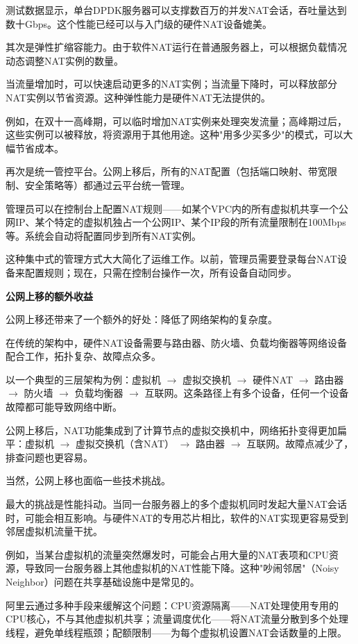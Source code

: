 测试数据显示，单台DPDK服务器可以支撑数百万的并发NAT会话，吞吐量达到数十Gbps。这个性能已经可以与入门级的硬件NAT设备媲美。

其次是弹性扩缩容能力。由于软件NAT运行在普通服务器上，可以根据负载情况动态调整NAT实例的数量。

当流量增加时，可以快速启动更多的NAT实例；当流量下降时，可以释放部分NAT实例以节省资源。这种弹性能力是硬件NAT无法提供的。

例如，在双十一高峰期，可以临时增加NAT实例来处理突发流量；高峰期过后，这些实例可以被释放，将资源用于其他用途。这种"用多少买多少"的模式，可以大幅节省成本。

再次是统一管控平台。公网上移后，所有的NAT配置（包括端口映射、带宽限制、安全策略等）都通过云平台统一管理。

管理员可以在控制台上配置NAT规则——如某个VPC内的所有虚拟机共享一个公网IP、某个特定的虚拟机独占一个公网IP、某个IP段的所有流量限制在100Mbps等。系统会自动将配置同步到所有NAT实例。

这种集中式的管理方式大大简化了运维工作。以前，管理员需要登录每台NAT设备来配置规则；现在，只需在控制台操作一次，所有设备自动同步。

\textbf{公网上移的额外收益}

公网上移还带来了一个额外的好处：降低了网络架构的复杂度。

在传统的架构中，硬件NAT设备需要与路由器、防火墙、负载均衡器等网络设备配合工作，拓扑复杂、故障点众多。

以一个典型的三层架构为例：虚拟机 $\rightarrow$ 虚拟交换机 $\rightarrow$ 硬件NAT $\rightarrow$ 路由器 $\rightarrow$ 防火墙 $\rightarrow$ 负载均衡器 $\rightarrow$ 互联网。这条路径上有多个设备，任何一个设备故障都可能导致网络中断。

公网上移后，NAT功能集成到了计算节点的虚拟交换机中，网络拓扑变得更加扁平：虚拟机 $\rightarrow$ 虚拟交换机（含NAT） $\rightarrow$ 路由器 $\rightarrow$ 互联网。故障点减少了，排查问题也更容易。

当然，公网上移也面临一些技术挑战。

最大的挑战是性能抖动。当同一台服务器上的多个虚拟机同时发起大量NAT会话时，可能会相互影响。与硬件NAT的专用芯片相比，软件的NAT实现更容易受到邻居虚拟机流量干扰。

例如，当某台虚拟机的流量突然爆发时，可能会占用大量的NAT表项和CPU资源，导致同一台服务器上其他虚拟机的NAT性能下降。这种"吵闹邻居"（Noisy Neighbor）问题在共享基础设施中是常见的。

阿里云通过多种手段来缓解这个问题：CPU资源隔离——NAT处理使用专用的CPU核心，不与其他虚拟机共享；流量调度优化——将NAT流量分散到多个处理线程，避免单线程瓶颈；配额限制——为每个虚拟机设置NAT会话数量的上限。

